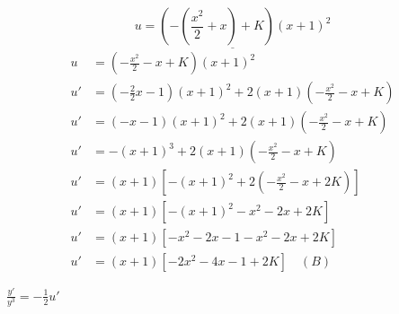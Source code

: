 \[
\underline{u = \left(- \left(\frac{x^2}{2} + x\right) + K\right) (x+1)^2}
\]
\begin{align*}
	u &= (-\frac{x^2}{2} - x + K) (x+1)^2 \\
	u' &= (-\frac{2}{2}x - 1) (x+1)^2 + 2 (x+1) (-\frac{x^2}{2} - x + K) \\
	u' &= (-x - 1) (x+1)^2 + 2 (x+1) (-\frac{x^2}{2} - x + K) \\
	u' &= -(x+1)^3 + 2 (x+1) (-\frac{x^2}{2} - x + K) \\
	u' &= (x+1) [-(x+1)^2 + 2(-\frac{x^2}{2} - x + 2K)] \\
	u' &= (x+1) [-(x+1)^2 -x^2 -2x + 2K] \\
	u' &= (x+1) [-x^2 - 2x -1 -x^2 -2x + 2K] \\
	u' &= (x+1) [-2x^2 - 4x -1 + 2K] \quad (B)
\end{align*}

$\frac{y'}{y^3} = -\frac{1}{2}u'$